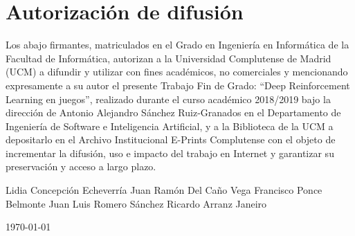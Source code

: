 \chapter*{Autorización de difusión}

   
Los abajo firmantes, matriculados en el Grado en Ingeniería en Informática de la Facultad de Informática, autorizan a la Universidad Complutense de Madrid (UCM) a difundir y utilizar con fines académicos, no comerciales y mencionando expresamente a su autor el presente Trabajo Fin de Grado: ``Deep Reinforcement Learning en juegos'', realizado durante el curso académico 2018/2019 bajo la dirección de Antonio Alejandro Sánchez Ruiz-Granados en el Departamento de Ingeniería de Software e Inteligencia Artificial, y a la Biblioteca de la UCM a depositarlo en el Archivo Institucional E-Prints Complutense con el objeto de incrementar la difusión, uso e impacto del trabajo en Internet y garantizar su preservación y acceso a largo plazo.

\vspace{5cm}

\begin{center}
	\large Lidia Concepción Echeverría	Juan Ramón Del Caño Vega	Francisco Ponce Belmonte	Juan Luis Romero Sánchez	Ricardo Arranz Janeiro
	
	\vspace{0.5cm}
	
	
	\today\\
	
\end{center}
